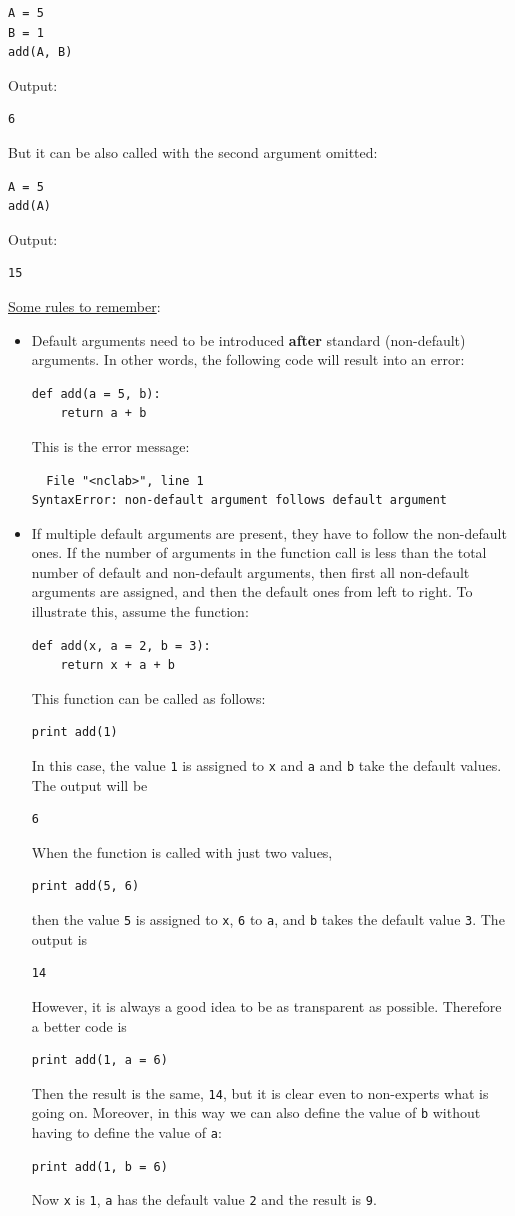 \begin{verbatim}
A = 5
B = 1
add(A, B)
\end{verbatim}
Output:
\begin{verbatim}
6
\end{verbatim}
But it can be also called with the second argument omitted:
\begin{verbatim}
A = 5
add(A)
\end{verbatim}
Output:
\begin{verbatim}
15
\end{verbatim}
\underline{Some rules to remember}:
\begin{itemize}
\item Default arguments need to be introduced {\bf after} standard (non-default) arguments. In other words, the 
      following code will result into an error:
\begin{verbatim}
def add(a = 5, b):
    return a + b
\end{verbatim}
This is the error message:
\begin{verbatim}
  File "<nclab>", line 1
SyntaxError: non-default argument follows default argument

\end{verbatim}
\item If multiple default arguments are present, they have to follow the non-default ones.
      If the number of arguments in the function call is less than the total number of default and non-default
      arguments, then first all non-default arguments are assigned, and then the default ones from 
      left to right. To illustrate this, assume the function:
\begin{verbatim}
def add(x, a = 2, b = 3):
    return x + a + b
\end{verbatim}
This function can be called as follows:
\begin{verbatim}
print add(1)
\end{verbatim}
In this case, the value {\tt 1} is assigned to {\tt x} and {\tt a} and {\tt b} take the default values.
The output will be 
\begin{verbatim}
6
\end{verbatim}
When the function is called with just two values,
\begin{verbatim}
print add(5, 6)
\end{verbatim}
then the value {\tt 5} is assigned to {\tt x}, {\tt 6} to {\tt a}, and {\tt b} takes the default value {\tt 3}.
The output is
\begin{verbatim}
14
\end{verbatim}
However, it is always a good idea to be as transparent as possible. Therefore a better code is 
\begin{verbatim}
print add(1, a = 6)
\end{verbatim}
Then the result is the same, {\tt 14}, but it is clear even to non-experts what is going on. Moreover,
in this way we can also define the value of {\tt b} without having to define the value of {\tt a}:
\begin{verbatim}
print add(1, b = 6)
\end{verbatim}
Now {\tt x} is {\tt 1}, {\tt a} has the default value {\tt 2} and the result is {\tt 9}.
\end{itemize}

